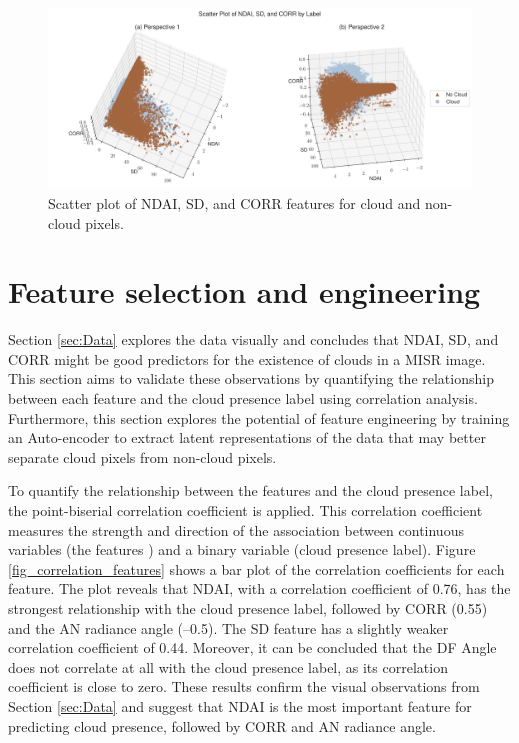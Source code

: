 \documentclass[11pt,letterpaper]{article}
\begin{document}
\begin{figure}[H]
    \centering
    \includegraphics[width=\linewidth]{figs/eda_3d_scatter.png}
    \caption{Scatter plot of NDAI, SD, and CORR features for cloud and non-cloud pixels.}
    \label{fig_eda_3d_scatter}
\end{figure}


\section{Feature selection and engineering}
\label{sec:feature_selection}
Section \ref{sec:Data} explores the data visually and concludes that NDAI, SD, and CORR might be good predictors for the existence of clouds in a MISR image. This section aims to validate these observations by quantifying the relationship between each feature and the cloud presence label using correlation analysis. Furthermore, this section explores the potential of feature engineering by training an Auto-encoder to extract latent representations of the data that may better separate cloud pixels from non-cloud pixels.

To quantify the relationship between the features and the cloud presence label, the point-biserial correlation coefficient is applied. This correlation coefficient measures the strength and direction of the association between continuous variables (the features ) and a binary variable (cloud presence label). Figure \ref{fig_correlation_features} shows a bar plot of the correlation coefficients for each feature. The plot reveals that NDAI, with a correlation coefficient of 0.76, has the strongest relationship with the cloud presence label, followed by CORR (0.55) and the AN radiance angle (–0.5). The SD feature has a slightly weaker correlation coefficient of 0.44. Moreover, it can be concluded that the DF Angle does not correlate at all with the cloud presence label, as its correlation coefficient is close to zero. These results confirm the visual observations from Section \ref{sec:Data} and suggest that NDAI is the most important feature for predicting cloud presence, followed by CORR and AN radiance angle.
\end{document}
